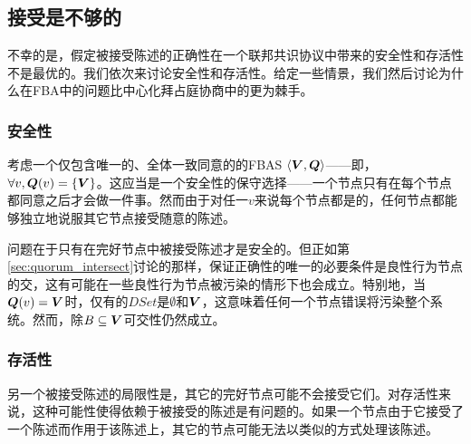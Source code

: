 \subsection{接受是不够的}
不幸的是，假定被接受陈述的正确性在一个联邦共识协议中带来的安全性和存活性不是最优的。我们依次来讨论安全性和存活性。给定一些情景，我们然后讨论为什么在FBA中的问题比中心化拜占庭协商中的更为棘手。

\subsubsection{安全性}\label{sec:voting_safety}
考虑一个仅包含唯一的、全体一致同意的{\quorum}的FBAS $\langle{\bm V},{\bm Q}\rangle$——即，$\forall v, {\bm Q}(v)=\left\{{\bm V}\right\}$。这应当是一个安全性的保守选择——一个节点只有在每个节点都同意之后才会做一件事。然而由于对任一$v$来说每个节点都是{\vblock}的，任何节点都能够独立地说服其它节点接受随意的陈述。

问题在于只有在完好节点中被接受陈述才是安全的。但正如第\ref{sec:quorum_intersect}讨论的那样，保证正确性的唯一的必要条件是良性行为节点的{\quorum}交，这有可能在一些良性行为节点被污染的情形下也会成立。特别地，当${\bm Q}(v)={\bm V}$时，仅有的$DSet$是$\emptyset$和${\bm V}$，这意味着任何一个节点错误将污染整个系统。然而，除$B\subseteq{\bm V}${\quorum}可交性仍然成立。

\subsubsection{存活性}\label{sec:accept_not_enough_liveness}
另一个被接受陈述的局限性是，其它的完好节点可能不会接受它们。对存活性来说，这种可能性使得依赖于被接受的陈述是有问题的。如果一个节点由于它接受了一个陈述而作用于该陈述上，其它的节点可能无法以类似的方式处理该陈述。

